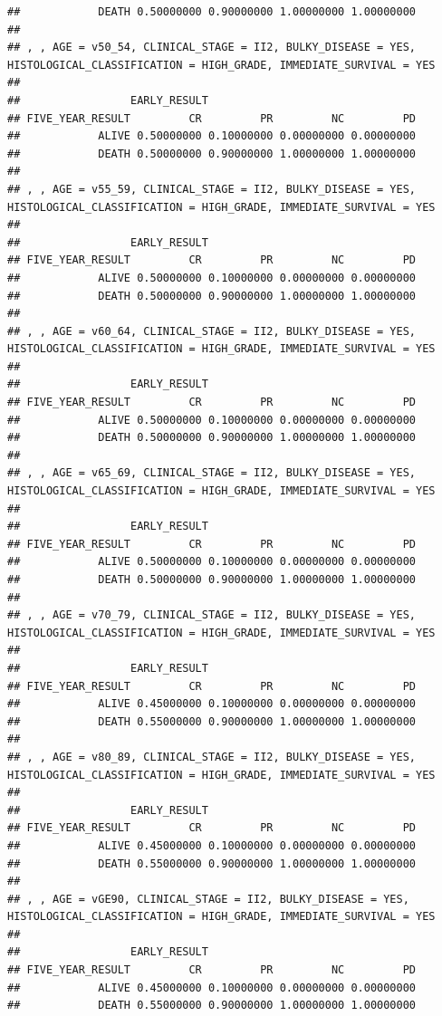 \documentclass[]{article}
\begin{document}
\begin{verbatim}
##            DEATH 0.50000000 0.90000000 1.00000000 1.00000000
## 
## , , AGE = v50_54, CLINICAL_STAGE = II2, BULKY_DISEASE = YES, HISTOLOGICAL_CLASSIFICATION = HIGH_GRADE, IMMEDIATE_SURVIVAL = YES
## 
##                 EARLY_RESULT
## FIVE_YEAR_RESULT         CR         PR         NC         PD
##            ALIVE 0.50000000 0.10000000 0.00000000 0.00000000
##            DEATH 0.50000000 0.90000000 1.00000000 1.00000000
## 
## , , AGE = v55_59, CLINICAL_STAGE = II2, BULKY_DISEASE = YES, HISTOLOGICAL_CLASSIFICATION = HIGH_GRADE, IMMEDIATE_SURVIVAL = YES
## 
##                 EARLY_RESULT
## FIVE_YEAR_RESULT         CR         PR         NC         PD
##            ALIVE 0.50000000 0.10000000 0.00000000 0.00000000
##            DEATH 0.50000000 0.90000000 1.00000000 1.00000000
## 
## , , AGE = v60_64, CLINICAL_STAGE = II2, BULKY_DISEASE = YES, HISTOLOGICAL_CLASSIFICATION = HIGH_GRADE, IMMEDIATE_SURVIVAL = YES
## 
##                 EARLY_RESULT
## FIVE_YEAR_RESULT         CR         PR         NC         PD
##            ALIVE 0.50000000 0.10000000 0.00000000 0.00000000
##            DEATH 0.50000000 0.90000000 1.00000000 1.00000000
## 
## , , AGE = v65_69, CLINICAL_STAGE = II2, BULKY_DISEASE = YES, HISTOLOGICAL_CLASSIFICATION = HIGH_GRADE, IMMEDIATE_SURVIVAL = YES
## 
##                 EARLY_RESULT
## FIVE_YEAR_RESULT         CR         PR         NC         PD
##            ALIVE 0.50000000 0.10000000 0.00000000 0.00000000
##            DEATH 0.50000000 0.90000000 1.00000000 1.00000000
## 
## , , AGE = v70_79, CLINICAL_STAGE = II2, BULKY_DISEASE = YES, HISTOLOGICAL_CLASSIFICATION = HIGH_GRADE, IMMEDIATE_SURVIVAL = YES
## 
##                 EARLY_RESULT
## FIVE_YEAR_RESULT         CR         PR         NC         PD
##            ALIVE 0.45000000 0.10000000 0.00000000 0.00000000
##            DEATH 0.55000000 0.90000000 1.00000000 1.00000000
## 
## , , AGE = v80_89, CLINICAL_STAGE = II2, BULKY_DISEASE = YES, HISTOLOGICAL_CLASSIFICATION = HIGH_GRADE, IMMEDIATE_SURVIVAL = YES
## 
##                 EARLY_RESULT
## FIVE_YEAR_RESULT         CR         PR         NC         PD
##            ALIVE 0.45000000 0.10000000 0.00000000 0.00000000
##            DEATH 0.55000000 0.90000000 1.00000000 1.00000000
## 
## , , AGE = vGE90, CLINICAL_STAGE = II2, BULKY_DISEASE = YES, HISTOLOGICAL_CLASSIFICATION = HIGH_GRADE, IMMEDIATE_SURVIVAL = YES
## 
##                 EARLY_RESULT
## FIVE_YEAR_RESULT         CR         PR         NC         PD
##            ALIVE 0.45000000 0.10000000 0.00000000 0.00000000
##            DEATH 0.55000000 0.90000000 1.00000000 1.00000000

\end{verbatim}
\end{document}
